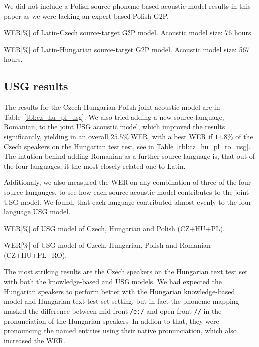 \documentclass[runningheads,a4paper]{llncs}
\begin{document}
We did not include a Polish source phoneme-based acoustic model results in this paper as we were lacking an expert-based Polish G2P.

\begin{table}
\parbox{.45\linewidth}{
\centering
\caption{WER[\%] of Latin-Czech source-target G2P model. Acoustic model size: 76 hours.}
\label{tbl:cz_phoneme}
}
\hfill
\parbox{.45\linewidth}{
\centering
\caption{WER[\%] of Latin-Hungarian source-target G2P model. Acoustic model size: 567 hours.}
\label{tbl:hu_phoneme}
}
\end{table}

\subsection{USG results}
The results for the Czech-Hungarian-Polish joint acoustic model are in Table~\ref{tbl:cz_hu_pl_usg}.
We also tried adding a new source language, Romanian, to the joint USG acoustic model, which improved the results significantly, yielding in an overall $25.5\%$ WER, with a best WER if $11.8\%$ of the Czech speakers on the Hungarian test test, see in Table~\ref{tbl:cz_hu_pl_ro_usg}.
The intution behind adding Romanian as a further source language is, that out of the four languages, it the most closely related one to Latin.

Additionaly, we also measured the WER on any combination of three of the four source langauges, to see how each source acoustic model contributes to the joint USG model.
We found, that each language contributed almost evenly to the four-language USG model. 
\begin{table}
\parbox{.45\linewidth}{
\centering
\caption{WER[\%] of USG model of Czech, Hungarian and Polish (CZ+HU+PL).}
\label{tbl:cz_hu_pl_usg}
}
\hfill
\parbox{.45\linewidth}{
\centering
\caption{WER[\%] of USG model of Czech, Hungarian, Polish and Romanian (CZ+HU+PL+RO).}
\label{tbl:cz_hu_pl_ro_usg}
}
\end{table}
The most striking results are the Czech speakers on the Hungarian text test set with both the knowledge-based and USG models.
We had expected the Hungarian speakers to perform better with the Hungarian knowledge-based model and Hungarian text test set setting, but in fact the phoneme mapping masked the difference between mid-front \texttt{/e:/} and open-front \texttt{//} in the pronunciation of the Hungarian speakers.
In addion to that, they were pronouncing the named entities using their native pronunciation, which also increased the WER.
\end{document}
